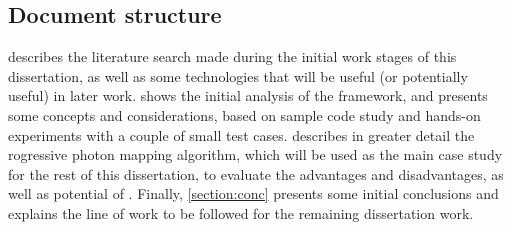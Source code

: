 \documentclass[main.tex]{subfiles}
\begin{document}
\subsection{Document structure}

 describes the literature search made during the initial work stages of this dissertation, as well as some technologies that will be useful (or potentially useful) in later work.  shows the initial analysis of the \gama framework, and presents some concepts and considerations, based on sample code study and hands-on experiments with a couple of small test cases.  describes in greater detail the rogressive photon mapping algorithm, which will be used as the main case study for the rest of this dissertation, to evaluate the advantages and disadvantages, as well as potential of \gama. Finally, \cref{section:conc} presents some initial conclusions and explains the line of work to be followed for the remaining dissertation work.
\end{document}
